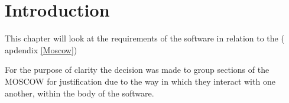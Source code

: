 
\section*{Introduction}
This chapter will look at the requirements of the software in relation to the  ( apdendix 
\ref{Moscow})

For the purpose of clarity the decision was made to group sections of the MOSCOW for justification due to the way in which they interact with one another, within the body of the software.